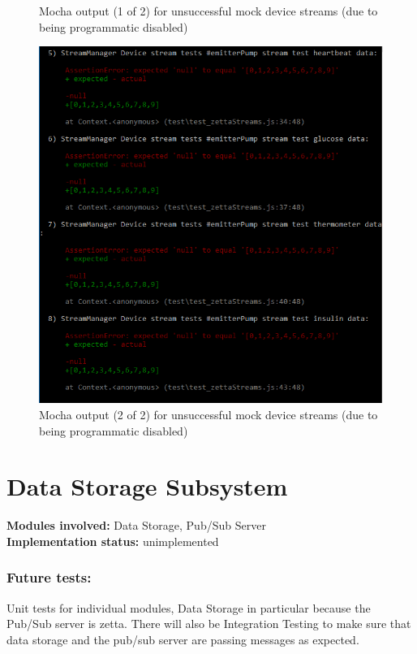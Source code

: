\documentclass[12pt]{article}
\begin{document}
{\begin{figure}[h!]
		\caption{Mocha output (1 of 2) for unsuccessful mock device streams (due to being programmatic disabled)}
	\end{figure}
	\begin{figure}[h!]
	\includegraphics[width=\textwidth]{tests/zettaStream/test-zetta-stream-fail01}
	\caption{Mocha output (2 of 2) for unsuccessful mock device streams (due to being programmatic disabled)}
	\end{figure}
	
	
	\pagebreak

	\section{Data Storage Subsystem}
	\textbf{Modules involved: } Data Storage, Pub/Sub Server \\
	\textbf{Implementation status:} unimplemented \\
	\subsubsection{Future tests:} Unit tests for individual modules, Data Storage in particular because the Pub/Sub server is zetta. There will also be Integration Testing to make sure that data storage and the pub/sub server are passing messages as expected. 

}
\end{document}
